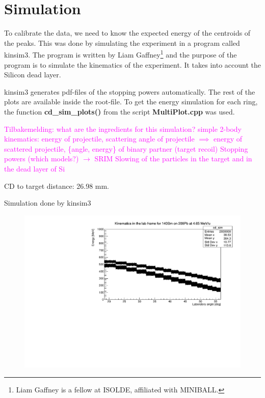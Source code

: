 \documentclass[twoside,english]{uiofysmaster/uiofysmaster}
\begin{document}
\section{Simulation}
To calibrate the data, we need to know the expected energy of the centroids of the peaks. 
This was done by simulating the experiment in a program called kinsim3. The program is written by Liam Gaffney\footnote{Liam Gaffney is a fellow at ISOLDE, affiliated with MINIBALL.} and the purpose of the program is to simulate the kinematics of the experiment. 
It takes into account the Silicon dead layer. 

kinsim3 generates pdf-files of the stopping powers automatically. 
The rest of the plots are available inside the root-file. 
To get the energy simulation for each ring, the function \textbf{cd\_sim\_plots()} from the script \textbf{MultiPlot.cpp} was used. 

\textcolor{Magenta}{Tilbakemelding: \newline 
what are the ingredients for this simulation? \newline
simple 2-body kinematics: energy of projectile, scattering angle of projectile $\implies$ energy of scattered projectile, \{angle, energy\} of binary partner (target recoil) \newline
Stopping powers (which models?) $\rightarrow$ SRIM \newline
Slowing of the particles in the target and in the dead layer of Si
}

\bigskip


CD to target distance: 26.98 mm.


Simulation done by kinsim3

\begin{figure}[H]\centering
    \includegraphics[width=\linewidth]{../Plots/simulation/kin_140Sm_208Pb.pdf}
\end{figure}
\end{document}
